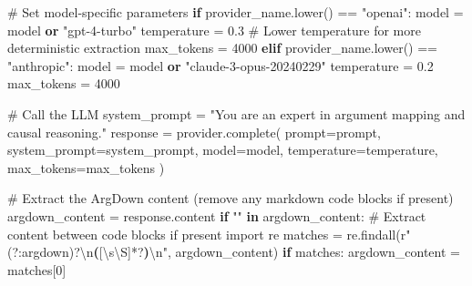 \documentclass[
  11pt,
  letterpaper,
]{book}
\newenvironment{Shaded}{\begin{snugshade}}{\end{snugshade}}
\newcommand{\CharTok}[1]{\textcolor[rgb]{0.13,0.47,0.30}{#1}}
\newcommand{\CommentTok}[1]{\textcolor[rgb]{0.37,0.37,0.37}{#1}}
\newcommand{\ControlFlowTok}[1]{\textcolor[rgb]{0.00,0.23,0.31}{\textbf{#1}}}
\newcommand{\DecValTok}[1]{\textcolor[rgb]{0.68,0.00,0.00}{#1}}
\newcommand{\FloatTok}[1]{\textcolor[rgb]{0.68,0.00,0.00}{#1}}
\newcommand{\ImportTok}[1]{\textcolor[rgb]{0.00,0.46,0.62}{#1}}
\newcommand{\KeywordTok}[1]{\textcolor[rgb]{0.00,0.23,0.31}{\textbf{#1}}}
\newcommand{\NormalTok}[1]{\textcolor[rgb]{0.00,0.23,0.31}{#1}}
\newcommand{\OperatorTok}[1]{\textcolor[rgb]{0.37,0.37,0.37}{#1}}
\newcommand{\PreprocessorTok}[1]{\textcolor[rgb]{0.68,0.00,0.00}{#1}}
\newcommand{\StringTok}[1]{\textcolor[rgb]{0.13,0.47,0.30}{#1}}
\newcommand{\VerbatimStringTok}[1]{\textcolor[rgb]{0.13,0.47,0.30}{#1}}
\begin{document}
\begin{Shaded}
\begin{Highlighting}[]
    \CommentTok{\# Set model{-}specific parameters}
    \ControlFlowTok{if}\NormalTok{ provider\_name.lower() }\OperatorTok{==} \StringTok{"openai"}\NormalTok{:}
\NormalTok{        model }\OperatorTok{=}\NormalTok{ model }\KeywordTok{or} \StringTok{"gpt{-}4{-}turbo"}
\NormalTok{        temperature }\OperatorTok{=} \FloatTok{0.3}  \CommentTok{\# Lower temperature for more deterministic extraction}
\NormalTok{        max\_tokens }\OperatorTok{=} \DecValTok{4000}
    \ControlFlowTok{elif}\NormalTok{ provider\_name.lower() }\OperatorTok{==} \StringTok{"anthropic"}\NormalTok{:}
\NormalTok{        model }\OperatorTok{=}\NormalTok{ model }\KeywordTok{or} \StringTok{"claude{-}3{-}opus{-}20240229"}
\NormalTok{        temperature }\OperatorTok{=} \FloatTok{0.2}
\NormalTok{        max\_tokens }\OperatorTok{=} \DecValTok{4000}

    \CommentTok{\# Call the LLM}
\NormalTok{    system\_prompt }\OperatorTok{=} \StringTok{"You are an expert in argument mapping and causal reasoning."}
\NormalTok{    response }\OperatorTok{=}\NormalTok{ provider.complete(}
\NormalTok{        prompt}\OperatorTok{=}\NormalTok{prompt,}
\NormalTok{        system\_prompt}\OperatorTok{=}\NormalTok{system\_prompt,}
\NormalTok{        model}\OperatorTok{=}\NormalTok{model,}
\NormalTok{        temperature}\OperatorTok{=}\NormalTok{temperature,}
\NormalTok{        max\_tokens}\OperatorTok{=}\NormalTok{max\_tokens}
\NormalTok{    )}

    \CommentTok{\# Extract the ArgDown content (remove any markdown code blocks if present)}
\NormalTok{    argdown\_content }\OperatorTok{=}\NormalTok{ response.content}
    \ControlFlowTok{if} \StringTok{"\textasciigrave{}\textasciigrave{}\textasciigrave{}"} \KeywordTok{in}\NormalTok{ argdown\_content:}
        \CommentTok{\# Extract content between code blocks if present}
        \ImportTok{import}\NormalTok{ re}
\NormalTok{        matches }\OperatorTok{=}\NormalTok{ re.findall(}\VerbatimStringTok{r"\textasciigrave{}\textasciigrave{}\textasciigrave{}}\NormalTok{(?:}\VerbatimStringTok{argdown}\NormalTok{)}\OperatorTok{?}\CharTok{\textbackslash{}n}\KeywordTok{(}\PreprocessorTok{[}\DecValTok{\textbackslash{}s\textbackslash{}S}\PreprocessorTok{]}\OperatorTok{*?}\KeywordTok{)}\CharTok{\textbackslash{}n}\VerbatimStringTok{\textasciigrave{}\textasciigrave{}\textasciigrave{}"}\NormalTok{, argdown\_content)}
        \ControlFlowTok{if}\NormalTok{ matches:}
\NormalTok{            argdown\_content }\OperatorTok{=}\NormalTok{ matches[}\DecValTok{0}\NormalTok{]}


\end{Highlighting}
\end{Shaded}
\end{document}
